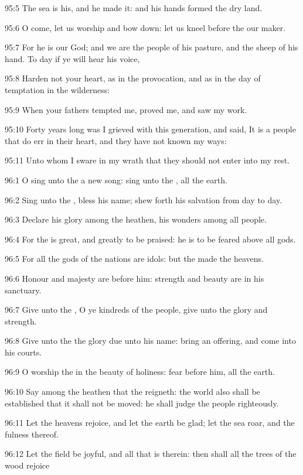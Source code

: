 95:5 The sea is his, and he made it: and his hands formed the dry land.

95:6 O come, let us worship and bow down: let us kneel before the \LORD our maker.

95:7 For he is our God; and we are the people of his pasture, and the sheep of his hand. To day if ye will hear his voice,

95:8 Harden not your heart, as in the provocation, and as in the day of temptation in the wilderness:

95:9 When your fathers tempted me, proved me, and saw my work.

95:10 Forty years long was I grieved with this generation, and said, It is a people that do err in their heart, and they have not known my ways:

95:11 Unto whom I sware in my wrath that they should not enter into my rest.



96:1 O sing unto the \LORD a new song: sing unto the \LORD, all the earth.

96:2 Sing unto the \LORD, bless his name; shew forth his salvation from day to day.

96:3 Declare his glory among the heathen, his wonders among all people.

96:4 For the \LORD is great, and greatly to be praised: he is to be feared above all gods.

96:5 For all the gods of the nations are idols: but the \LORD made the heavens.

96:6 Honour and majesty are before him: strength and beauty are in his sanctuary.

96:7 Give unto the \LORD, O ye kindreds of the people, give unto the \LORD glory and strength.

96:8 Give unto the \LORD the glory due unto his name: bring an offering, and come into his courts.

96:9 O worship the \LORD in the beauty of holiness: fear before him, all the earth.

96:10 Say among the heathen that the \LORD reigneth: the world also shall be established that it shall not be moved: he shall judge the people righteously.

96:11 Let the heavens rejoice, and let the earth be glad; let the sea roar, and the fulness thereof.

96:12 Let the field be joyful, and all that is therein: then shall all the trees of the wood rejoice


